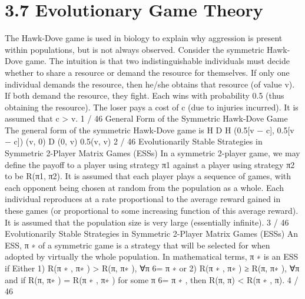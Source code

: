 \documentclass[]{report}
\begin{document}
	
\section{3.7 Evolutionary Game Theory}
The Hawk-Dove game is used in biology to explain why aggression
is present within populations, but is not always observed.
Consider the symmetric Hawk-Dove game. The intuition is that
two indistinguishable individuals must decide whether to share a
resource or demand the resource for themselves.
If only one individual demands the resource, then he/she obtains
that resource (of value v).
If both demand the resource, they fight. Each wins with probability
0.5 (thus obtaining the resource). The loser pays a cost of c (due
to injuries incurred). It is assumed that c > v.
1 / 46
General Form of the Symmetric Hawk-Dove Game
The general form of the symmetric Hawk-Dove game is
H D
H (0.5[v − c], 0.5[v − c]) (v, 0)
D (0, v) 0.5(v, v)
2 / 46
Evolutionarily Stable Strategies in Symmetric 2-Player
Matrix Games (ESSs)
In a symmetric 2-player game, we may define the payoff to a player
using strategy π1 against a player using strategy π2 to be
R(π1, π2).
It is assumed that each player plays a sequence of games, with each
opponent being chosen at random from the population as a whole.
Each individual reproduces at a rate proportional to the average
reward gained in these games (or proportional to some increasing
function of this average reward).
It is assumed that the population size is very large (essentially
infinite).
3 / 46
Evolutionarily Stable Strategies in Symmetric 2-Player
Matrix Games (ESSs)
An ESS, π
∗ of a symmetric game is a strategy that will be selected
for when adopted by virtually the whole population. In
mathematical terms, π
∗
is an ESS if
Either 1) R(π
∗
, π∗
) > R(π, π∗
), ∀π 6= π
∗
or 2) R(π
∗
, π∗
) ≥ R(π, π∗
), ∀π and if R(π, π∗
) = R(π
∗
, π∗
) for
some π 6= π
∗
, then R(π, π) < R(π
∗
, π).
4 / 46
\end{document}

